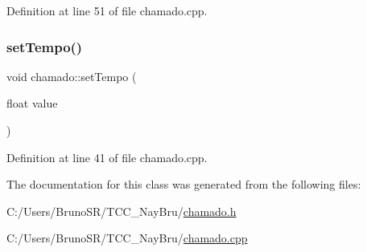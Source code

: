 Definition at line 51 of file chamado.\+cpp.

\hypertarget{classchamado_ae191e05877c78b5e3431011a2265fc15}{}\label{classchamado_ae191e05877c78b5e3431011a2265fc15} 
\subsubsection{\texorpdfstring{set\+Tempo()}{setTempo()}}
{\footnotesize\ttfamily void chamado\+::set\+Tempo (\begin{DoxyParamCaption}\item[{float}]{value }\end{DoxyParamCaption})}



Definition at line 41 of file chamado.\+cpp.



The documentation for this class was generated from the following files\+:\begin{DoxyCompactItemize}
\item 
C\+:/\+Users/\+Bruno\+S\+R/\+T\+C\+C\+\_\+\+Nay\+Bru/\hyperlink{chamado_8h}{chamado.\+h}\item 
C\+:/\+Users/\+Bruno\+S\+R/\+T\+C\+C\+\_\+\+Nay\+Bru/\hyperlink{chamado_8cpp}{chamado.\+cpp}\end{DoxyCompactItemize}
